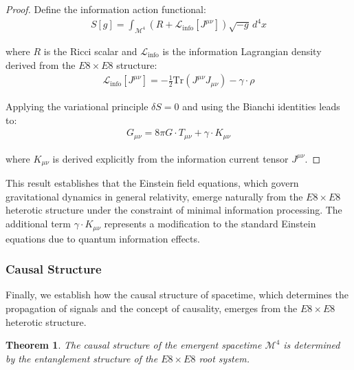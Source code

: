 \documentclass[11pt,english,twoside]{article}
\newtheorem{theorem}{Theorem}
\begin{document}
\begin{proof}
Define the information action functional:
\begin{align}
S[g] = \int_{\mathcal{M}^4} \left(R + \mathcal{L}_{\text{info}}[J^{\mu\nu}]\right) \sqrt{-g} \, d^4x
\end{align}

where $R$ is the Ricci scalar and $\mathcal{L}_{\text{info}}$ is the information Lagrangian density derived from the $E8\times E8$ structure:
\begin{align}
\mathcal{L}_{\text{info}}[J^{\mu\nu}] = -\frac{1}{2}\text{Tr}(J^{\mu\nu}J_{\mu\nu}) - \gamma \cdot \rho
\end{align}

Applying the variational principle $\delta S = 0$ and using the Bianchi identities leads to:
\begin{align}
G_{\mu\nu} = 8\pi G \cdot T_{\mu\nu} + \gamma \cdot K_{\mu\nu}
\end{align}

where $K_{\mu\nu}$ is derived explicitly from the information current tensor $J^{\mu\nu}$.
\end{proof}

This result establishes that the Einstein field equations, which govern gravitational dynamics in general relativity, emerge naturally from the $E8\times E8$ heterotic structure under the constraint of minimal information processing. The additional term $\gamma \cdot K_{\mu\nu}$ represents a modification to the standard Einstein equations due to quantum information effects.

\subsubsection{Causal Structure}

Finally, we establish how the causal structure of spacetime, which determines the propagation of signals and the concept of causality, emerges from the $E8\times E8$ heterotic structure.

\begin{theorem}
The causal structure of the emergent spacetime $\mathcal{M}^4$ is determined by the entanglement structure of the $E8\times E8$ root system.
\end{theorem}
\end{document}
